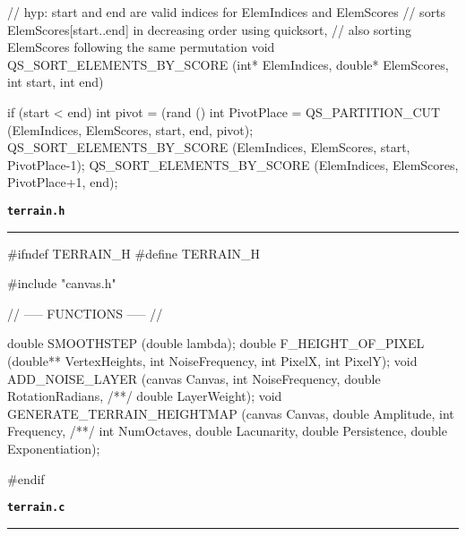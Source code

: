 \begin{C}
// hyp: start and end are valid indices for ElemIndices and ElemScores
// sorts ElemScores[start..end] in decreasing order using quicksort,
// also sorting ElemScores following the same permutation 
void QS_SORT_ELEMENTS_BY_SCORE (int* ElemIndices, double* ElemScores, int start, int end){
	
	if (start < end){
		int pivot = (rand () %
		int PivotPlace = QS_PARTITION_CUT (ElemIndices, ElemScores, start, end, pivot);
		QS_SORT_ELEMENTS_BY_SCORE (ElemIndices, ElemScores, start, PivotPlace-1);
		QS_SORT_ELEMENTS_BY_SCORE (ElemIndices, ElemScores, PivotPlace+1, end);
	}
}
\end{C}
\vspace*{5mm}
{\Large \texttt{\textbf{terrain.h}}}
\vspace*{1mm}
\hrule
\begin{C}
#ifndef TERRAIN_H
#define TERRAIN_H

#include "canvas.h"



// ----- FUNCTIONS ----- //

double SMOOTHSTEP (double lambda);
double F_HEIGHT_OF_PIXEL (double** VertexHeights, int NoiseFrequency, int PixelX, int PixelY);
void ADD_NOISE_LAYER (canvas Canvas, int NoiseFrequency, double RotationRadians,
/**/ double LayerWeight);
void GENERATE_TERRAIN_HEIGHTMAP (canvas Canvas, double Amplitude, int Frequency,
/**/ int NumOctaves, double Lacunarity, double Persistence, double Exponentiation);

#endif
\end{C}
\vspace*{5mm}
{\Large \texttt{\textbf{terrain.c}}}
\vspace*{1mm}
\hrule
